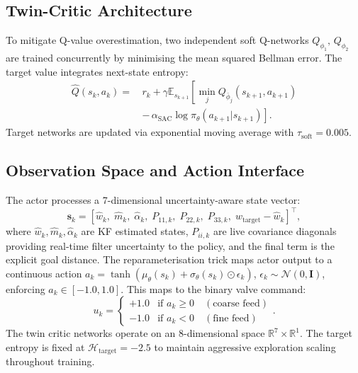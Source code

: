 \documentclass[conference]{IEEEtran}
\begin{document}
\subsection{Twin-Critic Architecture}

To mitigate Q-value overestimation, two independent soft Q-networks $Q_{\phi_1},\, Q_{\phi_2}$ are trained concurrently by minimising the mean squared Bellman error. The target value integrates next-state entropy:
\begin{equation}
\begin{split}
    \hat{Q}(s_k, a_k) = \, & r_k + \gamma \mathbb{E}_{s_{k+1}} \! \left[ \min_{j} Q_{\bar{\phi}_j}(s_{k+1}, a_{k+1}) \right. \\
    & \left. - \,\alpha_{\text{SAC}} \log \pi_\theta(a_{k+1} | s_{k+1}) \right].
\end{split}
\end{equation}
Target networks are updated via exponential moving average with $\tau_\text{soft} = 0.005$.

\subsection{Observation Space and Action Interface}

The actor processes a 7-dimensional uncertainty-aware state vector:
\begin{equation}
    \mathbf{s}_k = \left[\hat{w}_k,\; \hat{m}_k,\; \hat{\alpha}_k,\; P_{11,k},\; P_{22,k},\; P_{33,k},\; w_{\text{target}} - \hat{w}_k\right]^\top,
\end{equation}
where $\hat{w}_k, \hat{m}_k, \hat{\alpha}_k$ are KF estimated states, $P_{ii,k}$ are live covariance diagonals providing real-time filter uncertainty to the policy, and the final term is the explicit goal distance. The reparameterisation trick maps actor output to a continuous action $a_k = \tanh(\mu_\theta(s_k) + \sigma_\theta(s_k)\odot\epsilon_k)$, $\epsilon_k \sim \mathcal{N}(0, \mathbf{I})$, enforcing $a_k \in [-1.0, 1.0]$. This maps to the binary valve command:
\begin{equation}
    u_k = \begin{cases} +1.0 & \text{if } a_k \geq 0 \quad (\text{coarse feed}) \\ -1.0 & \text{if } a_k < 0 \quad (\text{fine feed}) \end{cases}.
\end{equation}
The twin critic networks operate on an 8-dimensional space $\mathbb{R}^7 \times \mathbb{R}^1$. The target entropy is fixed at $\mathcal{H}_\text{target} = -2.5$ to maintain aggressive exploration scaling throughout training.
\end{document}
